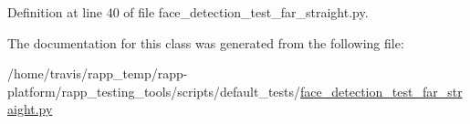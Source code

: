 Definition at line 40 of file face\-\_\-detection\-\_\-test\-\_\-far\-\_\-straight.\-py.



The documentation for this class was generated from the following file\-:\begin{DoxyCompactItemize}
\item 
/home/travis/rapp\-\_\-temp/rapp-\/platform/rapp\-\_\-testing\-\_\-tools/scripts/default\-\_\-tests/\hyperlink{face__detection__test__far__straight_8py}{face\-\_\-detection\-\_\-test\-\_\-far\-\_\-straight.\-py}\end{DoxyCompactItemize}
